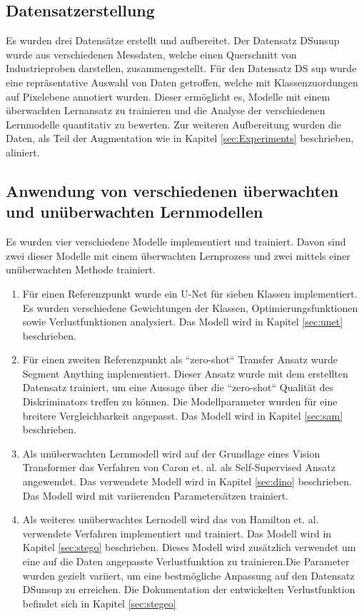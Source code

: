 \subsection*{Datensatzerstellung}
Es wurden drei Datensätze erstellt und aufbereitet. Der Datensatz DS\textunderscore unsup wurde aus verschiedenen Messdaten, welche einen Querschnitt von Industrieproben darstellen, zusammengestellt. 
Für den  Datensatz DS \textunderscore sup wurde eine repräsentative Auswahl von Daten getroffen, welche mit Klassenzuordungen auf Pixelebene annotiert wurden. Dieser ermöglicht es, Modelle mit einem überwachten Lernansatz zu trainieren und die Analyse der verschiedenen Lernmodelle quantitativ zu bewerten. Zur weiteren Aufbereitung wurden die Daten, als Teil der Augmentation wie in Kapitel \ref{sec:Experiments} beschrieben, aliniert.   

\subsection*{Anwendung von verschiedenen überwachten und unüberwachten Lernmodellen}

Es wurden  vier verschiedene Modelle implementiert und trainiert. Davon sind zwei dieser Modelle mit einem überwachten Lernprozess und zwei mittels einer unüberwachten Methode trainiert. 
\begin{enumerate}
    \item Für einen Referenzpunkt wurde ein U-Net \cite{UNETRonneberger2015} für sieben Klassen implementiert. Es wurden verschiedene Gewichtungen der Klassen, Optimierungsfunktionen sowie Verlustfunktionen analysiert. Das Modell wird in Kapitel \ref{sec:unet} beschrieben. 
    \item Für einen zweiten Referenzpunkt als ``zero-shot`` Transfer Ansatz wurde Segment Anything \cite{SAMKirillov2023} implementiert. Dieser Ansatz wurde mit dem erstellten Datensatz trainiert, um eine Aussage über die ``zero-shot`` Qualität des Diskriminators treffen zu können. 
    Die Modellparameter wurden für eine breitere Vergleichbarkeit angepasst. Das Modell wird in Kapitel \ref{sec:sam} beschrieben.
    \item  Als unüberwachten Lernmodell wird auf der Grundlage eines Vision Transformer \cite{ViTdosovitskiy2021image} das Verfahren von Caron et. al. \cite{caron2021emerging} als Self-Supervised Ansatz angewendet. Das verwendete Modell wird in Kapitel \ref{sec:dino} beschrieben. Das Modell wird mit variierenden Parametersätzen trainiert. 
    \item  Als weiteres unüberwachtes Lernodell wird das von Hamilton et. al. verwendete Verfahren \cite{STEGOhamilton2022unsupervised} implementiert und trainiert. Das Modell wird in Kapitel \ref{sec:stego} beschrieben. 
    Dieses Modell wird zusätzlich verwendet um eine auf die Daten angepasste Verlustfunktion zu trainieren.Die Parameter wurden gezielt variiert, um eine bestmögliche Anpassung auf den Datensatz DS\textunderscore unsup zu erreichen. Die Dokumentation der entwickelten Verlustfunktion befindet sich in Kapitel \ref{sec:stegeo}
    
\end{enumerate}
